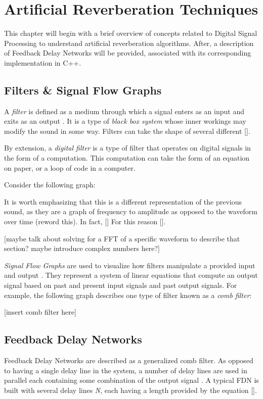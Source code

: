 \chapter{Artificial Reverberation Techniques}
\hspace*{-0.15cm}This chapter will begin with a brief overview of concepts related to Digital Signal Processing to understand artificial reverberation algorithms. After, a description of Feedback Delay Networks will be provided, associated with its corresponding implementation in C++.

\section{Filters \& Signal Flow Graphs}
A \textit{filter} is defined as a medium through which a signal enters as an input and exits as an output \cite{FILTERS07}. It is a type of \textit{black box system} whose inner workings may modify the sound in some way. Filters can take the shape of several different [].

By extension, a \textit{digital filter} is a type of filter that operates on digital signals in the form of a computation. This computation can take the form of an equation on paper, or a loop of code in a computer.

Consider the following graph:

It is worth emphasizing that this is a different representation of the previous sound, as they are a graph of frequency to amplitude as opposed to the waveform over time (reword this). In fact, [] For this reason [].

[maybe talk about solving for a FFT of a specific waveform to describe that section? maybe introduce complex numbers here?]

\textit{Signal Flow Graphs} are used to visualize how filters manipulate a provided input and output \cite{FILTERS07}. They represent a system of linear equations that compute an output signal based on past and present input signals and past output signals. For example, the following graph describes one type of filter known as a \textit{comb filter}:

[insert comb filter here]



\section{Feedback Delay Networks}
Feedback Delay Networks are described as a generalized comb filter. As opposed to having a single delay line in the system, a number of delay lines are used in parallel each containing some combination of the output signal \cite{PUCKE}. A typical FDN is built with several delay lines \textit{N}, each having a length provided by the equation [].

